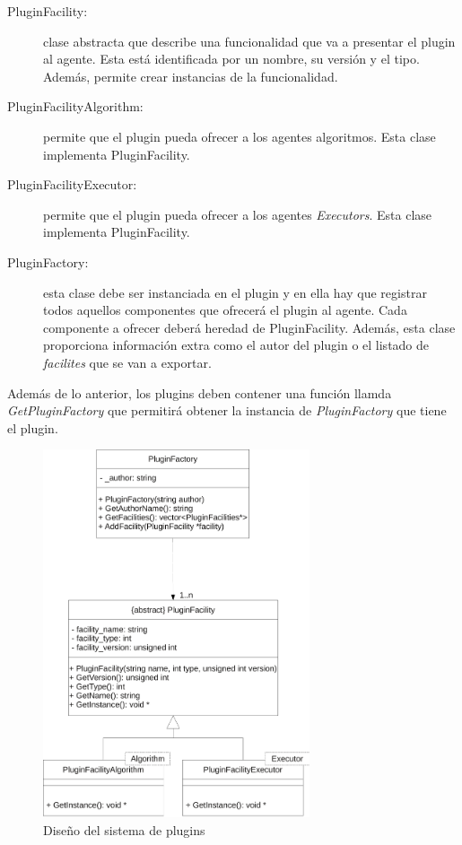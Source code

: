 \begin{description}
	\item[PluginFacility:] clase abstracta que describe una funcionalidad que va a presentar el plugin al agente. Esta está identificada por un nombre, su versión y el tipo. Además, permite crear instancias de la funcionalidad.
	
	\item[PluginFacilityAlgorithm:] permite que el plugin pueda ofrecer a los agentes algoritmos. Esta clase implementa PluginFacility.
	
	\item[PluginFacilityExecutor:] permite que el plugin pueda ofrecer a los agentes \emph{Executors}. Esta clase implementa PluginFacility.
	
	\item[PluginFactory:] esta clase debe ser instanciada en el plugin y en ella hay que registrar todos aquellos componentes que ofrecerá el plugin al agente. Cada componente a ofrecer deberá heredad de PluginFacility. Además, esta clase proporciona información extra como el autor del plugin o el listado de \emph{facilites} que se van a exportar.
\end{description}

Además de lo anterior, los plugins deben contener una función llamda \emph{GetPluginFactory} que permitirá obtener la instancia de \emph{PluginFactory} que tiene el plugin.

\begin{figure}
	\centering
	\includegraphics[width=0.7\textwidth]{images/plugins.pdf}
	\caption{Diseño del sistema de plugins}\label{fig:plugins}
\end{figure}

